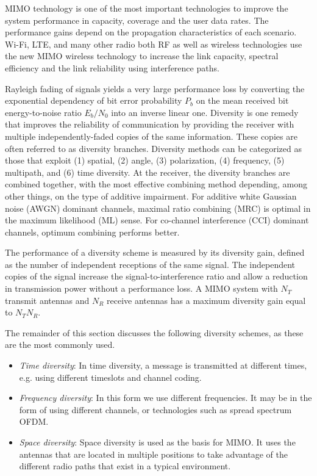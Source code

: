 
MIMO technology is one of the most important technologies to improve the system performance in capacity, coverage and the user data rates. The performance gains depend on the propagation characteristics of each scenario. Wi-Fi, LTE, and many other radio both RF as well as wireless technologies use the new MIMO wireless technology to increase the link capacity, spectral efficiency and the link reliability using interference paths.

Rayleigh fading of signals yields a very large performance loss by converting the exponential dependency of bit error probability $P_b$ on the mean received bit energy-to-noise ratio $E_b/N_0$ into an inverse linear one. Diversity is one remedy that improves the reliability of communication by providing the receiver with multiple independently-faded copies of the same information. These copies are often referred to as diversity branches. Diversity methods can be categorized as those that exploit (1) spatial, (2) angle, (3) polarization, (4) frequency, (5) multipath, and (6) time diversity. At the receiver, the diversity branches are combined together, with the most effective combining method depending, among other things, on the type of additive impairment. For additive white Gaussian noise (AWGN) dominant channels, maximal ratio combining (MRC) is optimal in the maximum likelihood (ML) sense. For co-channel interference (CCI) dominant channels, optimum combining performs better.

The performance of a diversity scheme is measured by its diversity gain, defined as the number of independent receptions of the same signal. The independent copies of the signal increase the signal-to-interference ratio and allow a reduction in transmission power without a performance loss. A MIMO system with $N_T$ transmit antennas and $N_R$ receive antennas has a maximum diversity gain equal to $N_TN_R$.

The remainder of this section discusses the following diversity schemes, as these are the most commonly used.
\begin{itemize}
\item \emph{Time diversity}: In time diversity, a message is transmitted at different times, e.g. using different timeslots and channel coding. 
\item \emph{Frequency diversity}: In this form we use different frequencies. It may be in the form of using different channels, or technologies such as spread spectrum OFDM. 
\item \emph{Space diversity}: Space diversity is used as the basis for MIMO. It uses the antennas that are located in multiple positions to take advantage of the different radio paths that exist in a typical environment. 
\end{itemize}

